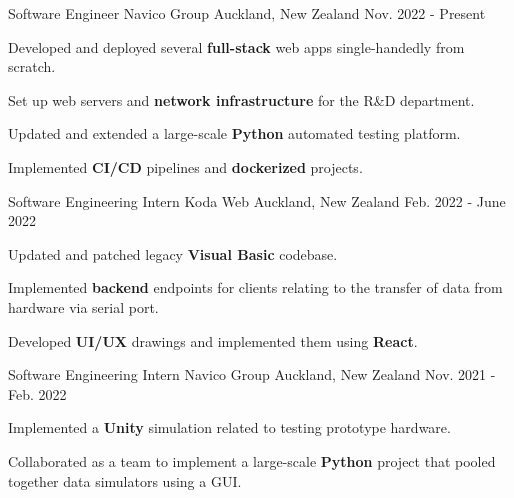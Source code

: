
\begin{cventries}
  \cventry
    {Software Engineer} %
    {Navico Group} %
    {Auckland, New Zealand} %
    {Nov. 2022 - Present} %
    {
      \begin{cvitems} %
        \item {Developed and deployed several \textbf{full-stack} web apps single-handedly from scratch.}
        \item {Set up web servers and \textbf{network infrastructure} for the R\&D department.}
        \item {Updated and extended a large-scale \textbf{Python} automated testing platform.}
        \item {Implemented \textbf{CI/CD} pipelines and \textbf{dockerized} projects.}
      \end{cvitems}
    }

    \cventry
    {Software Engineering Intern} %
    {Koda Web} %
    {Auckland, New Zealand} %
    {Feb. 2022 - June 2022} %
    {
      \begin{cvitems} %
        \item Updated and patched legacy \textbf{Visual Basic} codebase.
        \item Implemented \textbf{backend} endpoints for clients relating to the transfer of data from hardware via serial port.
        \item Developed \textbf{UI/UX} drawings and implemented them using \textbf{React}.
      \end{cvitems}
    }

  \cventry
    {Software Engineering Intern} %
    {Navico Group} %
    {Auckland, New Zealand} %
    {Nov. 2021 - Feb. 2022} %
    {
      \begin{cvitems} %
        \item Implemented a \textbf{Unity} simulation related to testing prototype hardware.
        \item Collaborated as a team to implement a large-scale \textbf{Python} project that pooled together data simulators using a GUI.
      \end{cvitems}
    }

\end{cventries}
